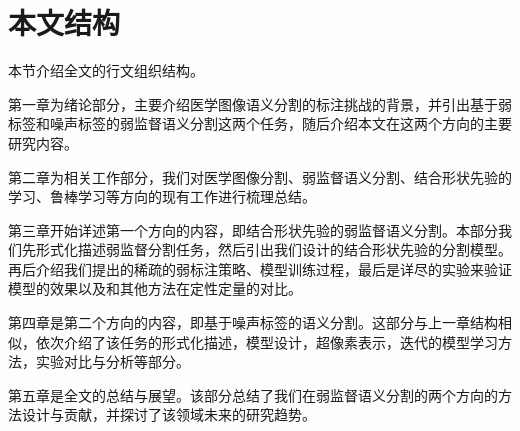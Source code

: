 \section{本文结构}
本节介绍全文的行文组织结构。

第一章为绪论部分，主要介绍医学图像语义分割的标注挑战的背景，并引出基于弱标签和噪声标签的弱监督语义分割这两个任务，随后介绍本文在这两个方向的主要研究内容。

第二章为相关工作部分，我们对医学图像分割、弱监督语义分割、结合形状先验的学习、鲁棒学习等方向的现有工作进行梳理总结。

第三章开始详述第一个方向的内容，即结合形状先验的弱监督语义分割。本部分我们先形式化描述弱监督分割任务，然后引出我们设计的结合形状先验的分割模型。再后介绍我们提出的稀疏的弱标注策略、模型训练过程，最后是详尽的实验来验证模型的效果以及和其他方法在定性定量的对比。

第四章是第二个方向的内容，即基于噪声标签的语义分割。这部分与上一章结构相似，依次介绍了该任务的形式化描述，模型设计，超像素表示，迭代的模型学习方法，实验对比与分析等部分。

第五章是全文的总结与展望。该部分总结了我们在弱监督语义分割的两个方向的方法设计与贡献，并探讨了该领域未来的研究趋势。